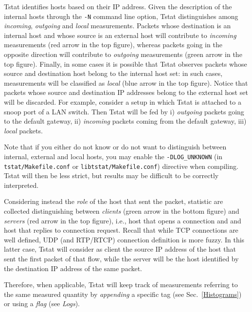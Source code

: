 \documentclass[11pt]{article}
\begin{document}
Tstat identifies hosts based on their IP address. Given the description
of the internal hosts through the \texttt{-N} command line option, Tstat
distinguishes among \textit{incoming}, \textit{outgoing} and \textit{local} 
measurements. Packets whose destination is an internal host and whose source is
an external host will contribute to \textit{incoming} measurements (red arrow in the
top figure), whereas packets going
in the opposite direction will contribute to \textit{outgoing} measurements (green
arrow in the top figure). Finally, in
some cases it is possible that Tstat observes packets whose source and
destination host belong to the internal host set: in such cases, measurements
will be classified as \textit{local} (blue arrow in the top figure).
Notice that packets whose source and destination IP
addresses belong to the external host set will be discarded.
For example, consider a setup in which Tstat is attached to a snoop port of a
LAN switch. Then Tstat will be fed by i) \textit{outgoing} packets going to the default gateway,
ii) \textit{incoming} packets coming from the default gateway, iii) \textit{local} packets.



Note that if you either do not know or do not want to distinguish between
internal, external and local hosts, you may enable the \texttt{-DLOG\_UNKNOWN} 
(in \texttt{tstat/Makefile.conf} or \texttt{libtstat/Makefile.conf})
directive when compiling. Tstat will then be less strict, but results may
be difficult to be correctly interpreted.



Considering instead the \textit{role} of the host that sent the packet, statistic are
collected distinguishing between \textit{clients} (green arrow in the bottom figure)
and \textit{servers} (red arrow in the top figure), i.e., host
that opens a connection and and host that replies to connection request. Recall
that while TCP connections are well defined, UDP (and RTP/RTCP) connection
definition is more fuzzy. In this latter case, Tstat will consider as client the
source IP address of the host that sent the first packet of that flow, while the
server will be the host identified by the destination IP address of the same
packet.



Therefore, when applicable, Tstat will keep track of measurements referring to
the same measured quantity by \textit{appending} a specific tag (see Sec.~\ref{Histograms}) or using a \textit{flag} 
(see \emph{Logs}).
\end{document}

